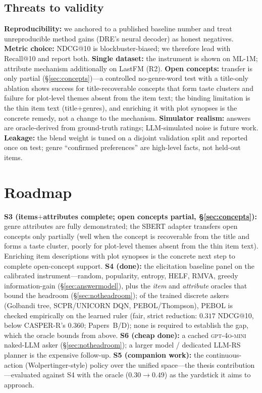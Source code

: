 \documentclass[11pt]{article}
\begin{document}
\subsection{Threats to validity}
\textbf{Reproducibility:} we anchored to a published baseline number and treat unreproducible method gains (DRE's
neural decoder) as honest negatives. \textbf{Metric choice:} NDCG@10 is blockbuster-biased; we therefore lead with
Recall@10 and report both. \textbf{Single dataset:} the instrument is shown on ML-1M; attribute mechanism
additionally on LastFM (R2). \textbf{Open concepts:} transfer is only partial (\S\ref{sec:concepts})---a controlled
no-genre-word test with a title-only ablation shows success for title-recoverable concepts that form taste clusters
and failure for plot-level themes absent from the item text; the binding limitation is the thin item text
(title$+$genres), and enriching it with plot synopses is the concrete remedy, not a change to the mechanism. \textbf{Simulator realism:} answers are oracle-derived from ground-truth ratings;
LLM-simulated noise is future work. \textbf{Leakage:} the blend weight is tuned on a disjoint validation split and
reported once on test; genre ``confirmed preferences'' are high-level facts, not held-out items.

\section{Roadmap}\label{sec:roadmap}
\textbf{S3 (items$+$attributes complete; open concepts partial, \S\ref{sec:concepts}):} genre attributes are fully
demonstrated; the SBERT adapter transfers open concepts only partially (well when the concept is recoverable from
the title and forms a taste cluster, poorly for plot-level themes absent from the thin item text). Enriching item
descriptions with plot synopses is the concrete next step to complete open-concept support.
\textbf{S4 (done):} the elicitation baseline panel on the calibrated instrument---random, popularity, entropy, HELF,
RMVA, greedy information-gain (\S\ref{sec:answermodel}), plus the \emph{item} and \emph{attribute} oracles that
bound the headroom (\S\ref{sec:notheadroom}); of the trained discrete askers (Golbandi tree, SCPR/UNICORN DQN,
PEBOL/Thompson), PEBOL is checked empirically on the learned ruler (fair, strict reduction: $0.317$ NDCG@10, below
CASPER-R's $0.360$; Papers~B/D); none is required to establish the gap, which the oracle bounds from above.
\textbf{S6 (cheap done):} a cached \textsc{gpt-4o-mini} naked-LLM asker (\S\ref{sec:notheadroom}); a larger model /
dedicated LLM-RS planner is the expensive follow-up. \textbf{S5 (companion work):} the continuous-action
(Wolpertinger-style) policy over the unified space---the thesis contribution---evaluated against S4 with the oracle
($0.30\!\to\!0.49$) as the yardstick it aims to approach.
\end{document}
